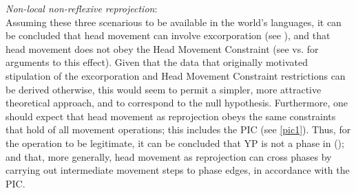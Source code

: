 \documentclass[output=paper
,modfonts
,nonflat]{langsci/langscibook}
\begin{document}
\ea\label{ex:mueller:26}{\itshape Non-local \label{25}non-reflexive reprojection}:\\
\z
Assuming these three scenarious to be available in the world's
languages, it can be concluded that head movement can involve
excorporation (see \cite{Roberts:91,Roberts:97:res}), and that head
movement does not obey the Head Movement Constraint (see
\cite{Roberts:09:hea,Roberts:10} vs. \cite{Travis:84} for arguments to
this effect). Given that the data that originally motivated
stipulation of the excorporation and Head Movement Constraint
restrictions can be derived otherwise, this would seem to permit a
simpler, more attractive theoretical approach, and to correspond to
the null hypothesis. Furthermore, one should expect that head movement
as reprojection obeys the same constraints that hold of all movement
operations; this includes the PIC (see \ref{pic1}). Thus, for the
operation to be legitimate, it can be concluded that YP is not a phase
in (\Last); and that, more generally, head movement as reprojection can
cross phases by carrying out intermediate movement steps to phase
edges, in accordance with the PIC.
\end{document}
